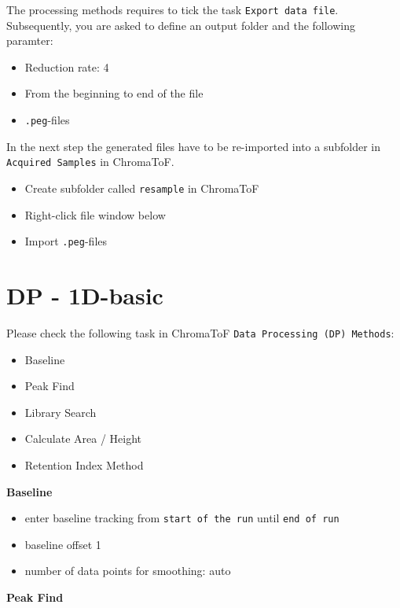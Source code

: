 \documentclass[]{book}
\providecommand{\tightlist}{%
  \setlength{\itemsep}{0pt}\setlength{\parskip}{0pt}}
\begin{document}
The processing methods requires to tick the task \texttt{Export\ data\ file}. Subsequently, you are asked to define an output folder and the following paramter:

\begin{itemize}
\tightlist
\item
  Reduction rate: 4
\item
  From the beginning to end of the file
\item
  \texttt{.peg}-files
\end{itemize}

In the next step the generated files have to be re-imported into a subfolder in \texttt{Acquired\ Samples} in ChromaToF.

\begin{itemize}
\tightlist
\item
  Create subfolder called \texttt{resample} in ChromaToF
\item
  Right-click file window below
\item
  Import \texttt{.peg}-files
\end{itemize}

\hypertarget{dp---1d-basic}{%
\section{DP - 1D-basic}\label{dp---1d-basic}}

Please check the following task in ChromaToF \texttt{Data\ Processing\ (DP)\ Methods}:

\begin{itemize}
\tightlist
\item
  Baseline
\item
  Peak Find
\item
  Library Search
\item
  Calculate Area / Height
\item
  Retention Index Method
\end{itemize}

\textbf{Baseline}

\begin{itemize}
\tightlist
\item
  enter baseline tracking from \texttt{start\ of\ the\ run} until \texttt{end\ of\ run}
\item
  baseline offset 1
\item
  number of data points for smoothing: auto
\end{itemize}

\textbf{Peak Find}
\end{document}
